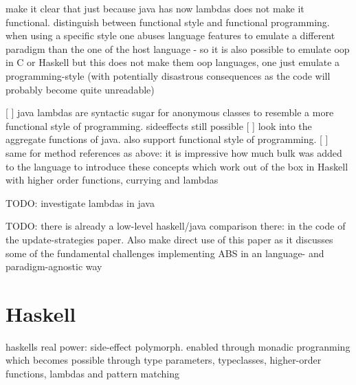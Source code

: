 make it clear that just because java has now lambdas does not make it functional. 
distinguish between functional style and functional programming. when using a specific style one abuses language features to emulate a different paradigm than the one of the host language - so it is also possible to emulate oop in C or Haskell but this does not make them oop languages, one just emulate a programming-style (with potentially disastrous consequences as the code will probably become quite unreadable)

[ ] java lambdas are syntactic sugar for anonymous classes to resemble a more functional style of programming. sideeffects still possible
[ ] look into the aggregate functions of java. also support functional style of programming.
[ ] same for method references as above: it is impressive how much bulk was added to the language to introduce these concepts which work out of the box in Haskell with higher order functions, currying and lambdas 

TODO: investigate lambdas in java

TODO: there is already a low-level haskell/java comparison there: in the code of the update-strategies paper. Also make direct use of this paper as it discusses some of the fundamental challenges implementing ABS in an language- and paradigm-agnostic way

\section{Haskell}
haskells real power: side-effect polymorph. enabled through monadic progranming which becomes possible through type parameters, typeclasses, higher-order functions, lambdas and pattern matching